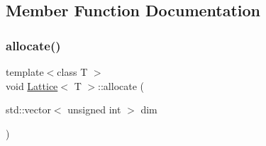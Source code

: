 \subsection{Member Function Documentation}
\mbox{\label{class_lattice_a5b4e162f06f7b4b90b4a9335ed2aabb5}} 
\subsubsection{\texorpdfstring{allocate()}{allocate()}}
{\footnotesize\ttfamily template$<$class T $>$ \\
void \mbox{\hyperlink{class_lattice}{Lattice}}$<$ T $>$\+::allocate (\begin{DoxyParamCaption}\item[{std\+::vector$<$ unsigned int $>$}]{dim }\end{DoxyParamCaption})\hspace{0.3cm}{\ttfamily [inline]}}

